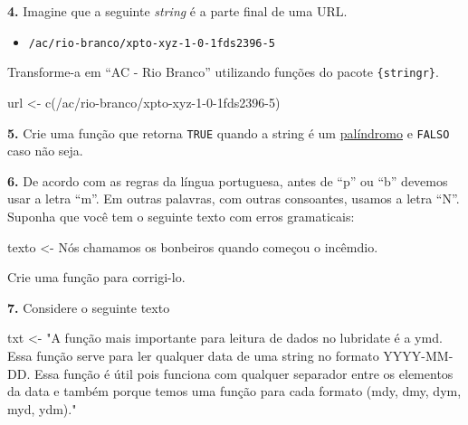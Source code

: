 \documentclass[
]{book}
\newenvironment{Shaded}{\begin{snugshade}}{\end{snugshade}}
\newcommand{\FunctionTok}[1]{\textcolor[rgb]{0.00,0.00,0.00}{#1}}
\newcommand{\NormalTok}[1]{#1}
\newcommand{\OtherTok}[1]{\textcolor[rgb]{0.56,0.35,0.01}{#1}}
\newcommand{\StringTok}[1]{\textcolor[rgb]{0.31,0.60,0.02}{#1}}
\providecommand{\tightlist}{%
  \setlength{\itemsep}{0pt}\setlength{\parskip}{0pt}}
\begin{document}
\textbf{4.} Imagine que a seguinte \emph{string} é a parte final de uma URL.

\begin{itemize}
\tightlist
\item
  \texttt{/ac/rio-branco/xpto-xyz-1-0-1fds2396-5}
\end{itemize}

Transforme-a em ``AC - Rio Branco'' utilizando funções do pacote \texttt{\{stringr\}}.

\begin{Shaded}
\begin{Highlighting}[]
\NormalTok{url }\OtherTok{\textless{}{-}} \FunctionTok{c}\NormalTok{(}\StringTok{\textquotesingle{}/ac/rio{-}branco/xpto{-}xyz{-}1{-}0{-}1fds2396{-}5\textquotesingle{}}\NormalTok{)}
\end{Highlighting}
\end{Shaded}

\textbf{5.} Crie uma função que retorna \texttt{TRUE} quando a string é um \href{https://pt.wikipedia.org/wiki/Pal\%C3\%ADndromo}{palíndromo} e \texttt{FALSO} caso não seja.

\textbf{6.} De acordo com as regras da língua portuguesa, antes de ``p'' ou ``b'' devemos usar a letra ``m''. Em outras palavras, com outras consoantes, usamos a letra ``N''. Suponha que você tem o seguinte texto com erros gramaticais:

\begin{Shaded}
\begin{Highlighting}[]
\NormalTok{texto }\OtherTok{\textless{}{-}} \StringTok{\textquotesingle{}Nós chamamos os bonbeiros quando começou o incêmdio.\textquotesingle{}}
\end{Highlighting}
\end{Shaded}

Crie uma função para corrigi-lo.

\textbf{7.} Considere o seguinte texto

\begin{Shaded}
\begin{Highlighting}[]
\NormalTok{txt }\OtherTok{\textless{}{-}} \StringTok{"A função mais importante para leitura de dados no \textasciigrave{}lubridate\textasciigrave{} é a \textasciigrave{}ymd\textasciigrave{}. Essa função serve para ler qualquer data de uma \textasciigrave{}string\textasciigrave{} no formato \textasciigrave{}YYYY{-}MM{-}DD\textasciigrave{}. Essa função é útil pois funciona com qualquer separador entre os elementos da data e também porque temos uma função para cada formato (\textasciigrave{}mdy\textasciigrave{}, \textasciigrave{}dmy\textasciigrave{}, \textasciigrave{}dym\textasciigrave{}, \textasciigrave{}myd\textasciigrave{}, \textasciigrave{}ydm\textasciigrave{})."}
\end{Highlighting}
\end{Shaded}
\end{document}

